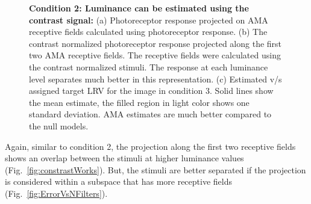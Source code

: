 \documentclass{jov}
\begin{document}
\begin{figure}
\begin{subfigure}[b]{0.22 \textwidth}
        \label{fig:constrstResults}
    \end{subfigure}
    \caption{{\bf Condition 2: Luminance can be estimated using the contrast signal:} (a) Photoreceptor response projected on AMA receptive fields calculated using photoreceptor response. (b) The contrast normalized photoreceptor response projected along the first two AMA receptive fields. The receptive fields were calculated using the contrast normalized stimuli. The response at each luminance level separates much better in this representation. (c) Estimated v/s assigned target LRV for the image in condition 3. Solid lines show the mean estimate, the filled region in light color  shows one standard deviation. AMA estimates are much better compared to the null models.}
\label{fig:importanceOfConstrast}
\end{figure}

Again, similar to condition 2, the projection along the first two receptive fields shows an overlap between the stimuli at higher luminance values (Fig.~\ref{fig:constrastWorks}). But, the stimuli are better separated if the projection is considered within a subspace that has more receptive fields (Fig.~\ref{fig:ErrorVsNFilters}).
\end{document}

